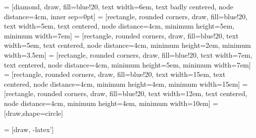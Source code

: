  


 = [diamond,                    draw, fill=blue!20, text width=6em, text badly centered, node distance=4cm, inner sep=0pt]
 =    [rectangle, rounded corners, draw, fill=blue!20, text width=5em, text centered,       node distance=4cm, minimum height=5em, minimum width=7em]
 =    [rectangle, rounded corners, draw, fill=blue!20, text width=5em, text centered,       node distance=4cm, minimum height=2em, minimum width=3.5em]
 =    [rectangle, rounded corners, draw, fill=blue!20, text width=7em, text centered,       node distance=4cm, minimum height=5em, minimum width=7em]
 =    [rectangle, rounded corners, draw, fill=blue!20, text width=15em, text centered,       node distance=4cm, minimum height=4em, minimum width=15em]
 =    [rectangle, rounded corners, draw, fill=blue!20, text width=12em, text centered,       node distance=4cm, minimum height=4em, minimum width=10em]
=[draw,shape=circle]

 = [draw, -latex']


